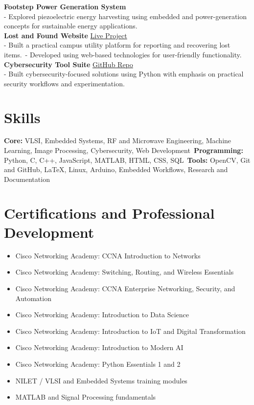 \documentclass[11pt,a4paper]{article}
\begin{document}
\textbf{Footstep Power Generation System}\\
- Explored piezoelectric energy harvesting using embedded and power-generation concepts for sustainable energy applications.\\

\textbf{Lost and Found Website} \hfill \href{https://gecnawadafind.web.app}{Live Project}\\
- Built a practical campus utility platform for reporting and recovering lost items.\
- Developed using web-based technologies for user-friendly functionality.\\

\textbf{Cybersecurity Tool Suite} \hfill \href{https://github.com/mdzaid-alam/PRODIGY_CS_05.git}{GitHub Repo}\\
- Built cybersecurity-focused solutions using Python with emphasis on practical security workflows and experimentation.

\section*{Skills}
\textbf{Core:} VLSI, Embedded Systems, RF and Microwave Engineering, Machine Learning, Image Processing, Cybersecurity, Web Development\
\textbf{Programming:} Python, C, C++, JavaScript, MATLAB, HTML, CSS, SQL\
\textbf{Tools:} OpenCV, Git and GitHub, LaTeX, Linux, Arduino, Embedded Workflows, Research and Documentation

\section*{Certifications and Professional Development}
\begin{itemize}
    \item Cisco Networking Academy: CCNA Introduction to Networks
    \item Cisco Networking Academy: Switching, Routing, and Wireless Essentials
    \item Cisco Networking Academy: CCNA Enterprise Networking, Security, and Automation
    \item Cisco Networking Academy: Introduction to Data Science
    \item Cisco Networking Academy: Introduction to IoT and Digital Transformation
    \item Cisco Networking Academy: Introduction to Modern AI
    \item Cisco Networking Academy: Python Essentials 1 and 2
    \item NILET / VLSI and Embedded Systems training modules
    \item MATLAB and Signal Processing fundamentals
\end{itemize}
\end{document}
